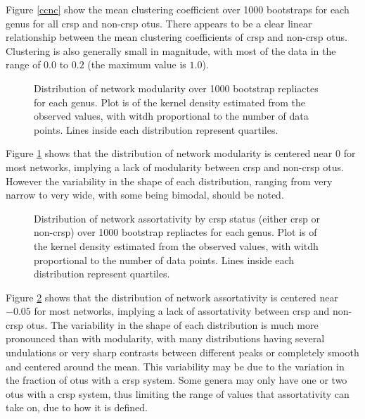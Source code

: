 \FloatBarrier
Figure \ref{ccnc} show the mean clustering coefficient over 1000 bootstraps for each genus for all \ac{crsp} and non-\ac{crsp} \ac{otu}s.
There appears to be a clear linear relationship between the mean clustering coefficients of \ac{crsp} and non-\ac{crsp} \ac{otu}s.
Clustering is also generally small in magnitude, with most of the data in the range of $0.0$ to $0.2$ (the maximum value is $1.0$).
\FloatBarrier
\begin{figure}[htb!]
    \caption{Distribution of network modularity over 1000 bootstrap repliactes for each genus. Plot is of the kernel density estimated from the observed values, with witdh proportional to the number of data points. Lines inside each distribution represent quartiles.}
    \label{mod}
\end{figure}
\FloatBarrier
Figure \ref{mod} shows that the distribution of network modularity is centered near $0$ for most networks, implying a lack of modularity between \ac{crsp} and non-\ac{crsp} \ac{otu}s.
However the variability in the shape of each distribution, ranging from very narrow to very wide, with some being bimodal, should be noted.
\FloatBarrier
\begin{figure}[htb!]
    \caption{Distribution of network assortativity by \ac{crsp} status (either \ac{crsp} or non-\ac{crsp}) over 1000 bootstrap repliactes for each genus. Plot is of the kernel density estimated from the observed values, with witdh proportional to the number of data points. Lines inside each distribution represent quartiles.}
    \label{asst}
\end{figure}
\FloatBarrier
Figure \ref{asst} shows that the distribution of network assortativity is centered near $-0.05$ for most networks, implying a lack of assortativity between \ac{crsp} and non-\ac{crsp} \ac{otu}s.
The variability in the shape of each distribution is much more pronounced than with modularity, with many distributions having several undulations or very sharp contrasts between different peaks or completely smooth and centered around the mean.
This variability may be due to the variation in the fraction of \ac{otu}s with a \ac{crsp} system.
Some genera may only have one or two \ac{otu}s with a \ac{crsp} system, thus limiting the range of values that assortativity can take on, due to how it is defined.
